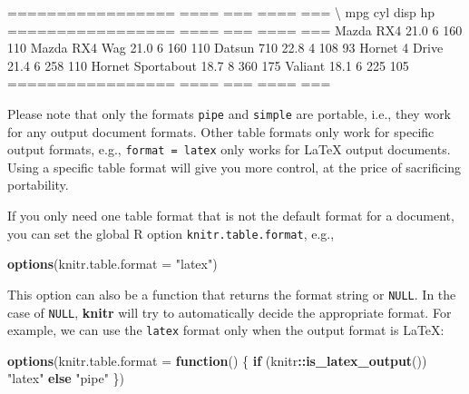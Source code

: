 \documentclass[
  11pt,
]{krantz}
\newenvironment{Shaded}{\begin{snugshade}}{\end{snugshade}}
\newcommand{\ControlFlowTok}[1]{\textcolor[rgb]{0.27,0.27,0.27}{\textbf{#1}}}
\newcommand{\DataTypeTok}[1]{\textcolor[rgb]{0.27,0.27,0.27}{#1}}
\newcommand{\KeywordTok}[1]{\textcolor[rgb]{0.27,0.27,0.27}{\textbf{#1}}}
\newcommand{\NormalTok}[1]{#1}
\newcommand{\OperatorTok}[1]{\textcolor[rgb]{0.43,0.43,0.43}{\textbf{#1}}}
\newcommand{\StringTok}[1]{\textcolor[rgb]{0.5,0.5,0.5}{#1}}
\begin{document}
\begin{Shaded}
\begin{Highlighting}[]
\NormalTok{=================  ====  ===  ====  ===}
\NormalTok{\textbackslash{}                   mpg  cyl  disp   hp}
\NormalTok{=================  ====  ===  ====  ===}
\NormalTok{Mazda RX4          21.0    6   160  110}
\NormalTok{Mazda RX4 Wag      21.0    6   160  110}
\NormalTok{Datsun 710         22.8    4   108   93}
\NormalTok{Hornet 4 Drive     21.4    6   258  110}
\NormalTok{Hornet Sportabout  18.7    8   360  175}
\NormalTok{Valiant            18.1    6   225  105}
\NormalTok{=================  ====  ===  ====  ===}
\end{Highlighting}
\end{Shaded}

Please note that only the formats \texttt{pipe} and \texttt{simple} are portable, i.e., they work for any output document formats. Other table formats only work for specific output formats, e.g., \texttt{format\ =\ \textquotesingle{}latex\textquotesingle{}} only works for LaTeX output documents. Using a specific table format will give you more control, at the price of sacrificing portability.

If you only need one table format that is not the default format for a document, you can set the global R option \texttt{knitr.table.format}, e.g.,

\begin{Shaded}
\begin{Highlighting}[]
\KeywordTok{options}\NormalTok{(}\DataTypeTok{knitr.table.format =} \StringTok{"latex"}\NormalTok{)}
\end{Highlighting}
\end{Shaded}

This option can also be a function that returns the format string or \texttt{NULL}. In the case of \texttt{NULL}, \textbf{knitr} will try to automatically decide the appropriate format. For example, we can use the \texttt{latex} format only when the output format is LaTeX:

\begin{Shaded}
\begin{Highlighting}[]
\KeywordTok{options}\NormalTok{(}\DataTypeTok{knitr.table.format =} \ControlFlowTok{function}\NormalTok{() \{}
  \ControlFlowTok{if}\NormalTok{ (knitr}\OperatorTok{::}\KeywordTok{is_latex_output}\NormalTok{()) }
    \StringTok{"latex"} \ControlFlowTok{else} \StringTok{"pipe"}
\NormalTok{\})}
\end{Highlighting}
\end{Shaded}
\end{document}
